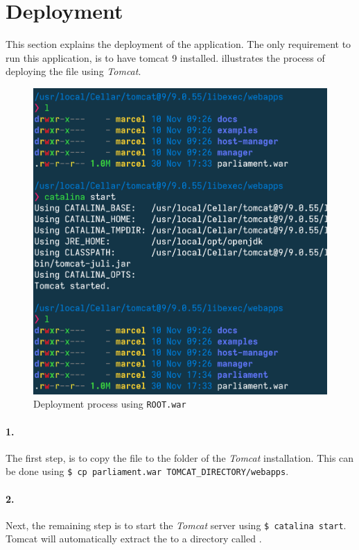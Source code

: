 \section{Deployment}\label{sec:03_depl}
This section explains the deployment of the application.
The only requirement to run this application, is to have tomcat 9 installed.
 illustrates the process of deploying the  file using \textit{Tomcat}.
\begin{figure}[h]
\centering
\includegraphics[scale=0.5]{images/03_depl/process}
\caption{Deployment process using \texttt{ROOT.war}}
\label{fig:subsubsec:03_depl_process}
\end{figure}

\paragraph{1.}
The first step, is to copy the  file to the  folder of the \textit{Tomcat} installation.\newline
This can be done using \texttt{\$ cp parliament.war TOMCAT\_DIRECTORY/webapps}.

\paragraph{2.}
Next, the remaining step is to start the \textit{Tomcat} server using \texttt{\$ catalina start}. Tomcat will automatically extract the  to a directory called .

